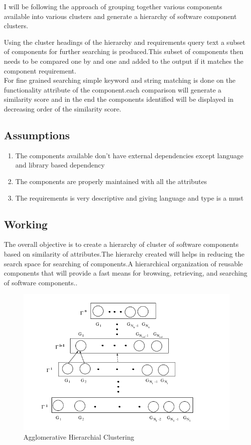 \documentclass[a4paper,12pt]{article}
\begin{document}
I will be following the approach of grouping together various components available into various clusters and generate a hierarchy of software component clusters.

Using the cluster headings of the hierarchy and requirements query text a subset of components for further searching is produced.This subset of components then needs to be compared one by and one and added to the output if it matches the component requirement.\\

For fine grained searching simple keyword and string matching is done on the functionality attribute of the component.each comparison will generate a similarity score and in the end the components identified will be displayed in decreasing order of the similarity score.
\subsection{Assumptions}
\begin{enumerate}
    \item The components available don't have external dependencies except language and library based dependency
    \item The components are properly maintained with all the attributes
    \item The requirements is very descriptive and giving language and type is a must
\end{enumerate}

\subsection{Working}
The overall objective is to create a hierarchy of cluster of software components based on similarity of attributes.The hierarchy created will helps in reducing the search space for searching of components.A hierarchical organization of reusable components that will provide a fast means for browsing, retrieving, and searching of software components.\cite{formal}.

\begin{figure}[t]
    \centering
    \includegraphics[scale=0.5]{agglomerativeClustering.png}
    \caption{Agglomerative Hierarchial Clustering}
    \label{fig:working}
\end{figure}
\end{document}
